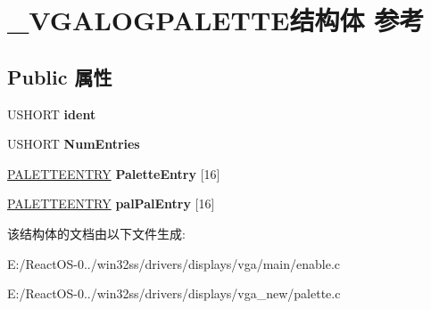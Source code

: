 \hypertarget{struct___v_g_a_l_o_g_p_a_l_e_t_t_e}{}\section{\+\_\+\+V\+G\+A\+L\+O\+G\+P\+A\+L\+E\+T\+T\+E结构体 参考}
\label{struct___v_g_a_l_o_g_p_a_l_e_t_t_e}
\subsection*{Public 属性}
\begin{DoxyCompactItemize}
\item 
\mbox{\label{struct___v_g_a_l_o_g_p_a_l_e_t_t_e_a960412f06c4916c666650a27b4115bc8}} 
U\+S\+H\+O\+RT {\bfseries ident}
\item 
\mbox{\label{struct___v_g_a_l_o_g_p_a_l_e_t_t_e_a87300227b117b7c2d1e5fa34fb605bf9}} 
U\+S\+H\+O\+RT {\bfseries Num\+Entries}
\item 
\mbox{\label{struct___v_g_a_l_o_g_p_a_l_e_t_t_e_a843e9c97aa6ac7f3902010d98b6ef9e1}} 
\hyperlink{structtag_p_a_l_e_t_t_e_e_n_t_r_y}{P\+A\+L\+E\+T\+T\+E\+E\+N\+T\+RY} {\bfseries Palette\+Entry} \mbox{[}16\mbox{]}
\item 
\mbox{\label{struct___v_g_a_l_o_g_p_a_l_e_t_t_e_a74e1439cebb7a4c67062b4e65b6ba80b}} 
\hyperlink{structtag_p_a_l_e_t_t_e_e_n_t_r_y}{P\+A\+L\+E\+T\+T\+E\+E\+N\+T\+RY} {\bfseries pal\+Pal\+Entry} \mbox{[}16\mbox{]}
\end{DoxyCompactItemize}


该结构体的文档由以下文件生成\+:\begin{DoxyCompactItemize}
\item 
E\+:/\+React\+O\+S-\/0../win32ss/drivers/displays/vga/main/enable.\+c\item 
E\+:/\+React\+O\+S-\/0../win32ss/drivers/displays/vga\+\_\+new/palette.\+c\end{DoxyCompactItemize}

